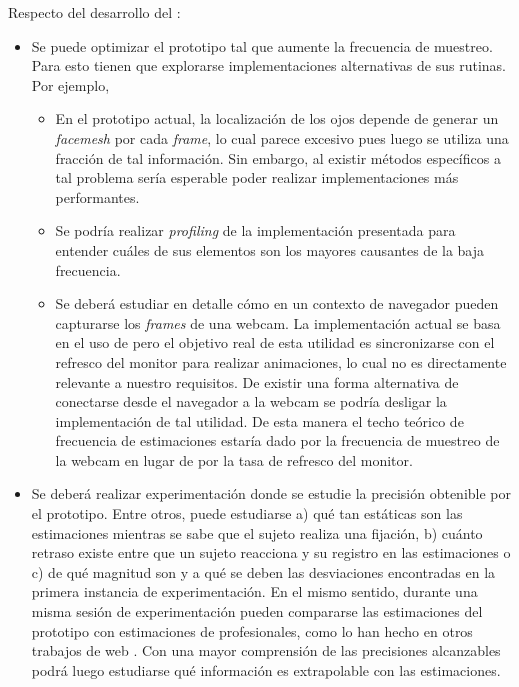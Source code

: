 Respecto del desarrollo del \eyetracker: 
\begin{itemize}
  \item Se puede optimizar el prototipo tal que aumente la frecuencia de
muestreo.
  Para esto tienen que explorarse implementaciones alternativas de sus rutinas.
  Por ejemplo, 
  \begin{itemize}
    \item En el prototipo actual, la localización de los ojos depende de
generar un \textit{facemesh} por cada \textit{frame}, lo cual parece excesivo
pues luego se utiliza una fracción de tal información.
    Sin embargo, al existir métodos específicos a tal problema
\cite{hansen_2009_eye_of_the_beholder} sería esperable poder realizar
implementaciones más performantes. 

    \item Se podría realizar \textit{profiling} de la implementación presentada
para entender cuáles de sus elementos son los mayores causantes de la baja
frecuencia. 

    \item Se deberá estudiar en detalle cómo en un contexto de navegador pueden
capturarse los \textit{frames} de una webcam.
    La implementación actual se basa en el uso de \raf pero el
objetivo real de esta utilidad es sincronizarse con el refresco del monitor
para realizar animaciones, lo cual no es directamente relevante a nuestro
requisitos.
    De existir una forma alternativa de conectarse desde el navegador a la
webcam se podría desligar la implementación de tal utilidad.
    De esta manera el techo teórico de frecuencia de estimaciones estaría dado
por la frecuencia de muestreo de la webcam en lugar de por la tasa de refresco
del monitor.
  \end{itemize}

  \item Se deberá realizar experimentación donde se estudie la precisión
obtenible por el prototipo.
  Entre otros, puede estudiarse a) qué tan estáticas son las estimaciones
mientras se sabe que el sujeto realiza una fijación, b) cuánto retraso existe
entre que un sujeto reacciona y su registro en las estimaciones o c) de qué
magnitud son y a qué se deben las desviaciones encontradas en la primera
instancia de experimentación.
  En el mismo sentido, durante una misma sesión de experimentación pueden
compararse las estimaciones del prototipo con estimaciones de \eyetrackers 
profesionales, como lo han hecho en otros trabajos de \eyetracking web
\cite{xu_2015_turker_gaze, huang_2016_pace}.
  Con una mayor comprensión de las precisiones alcanzables podrá luego
estudiarse qué información es extrapolable con las estimaciones.


\end{itemize}
